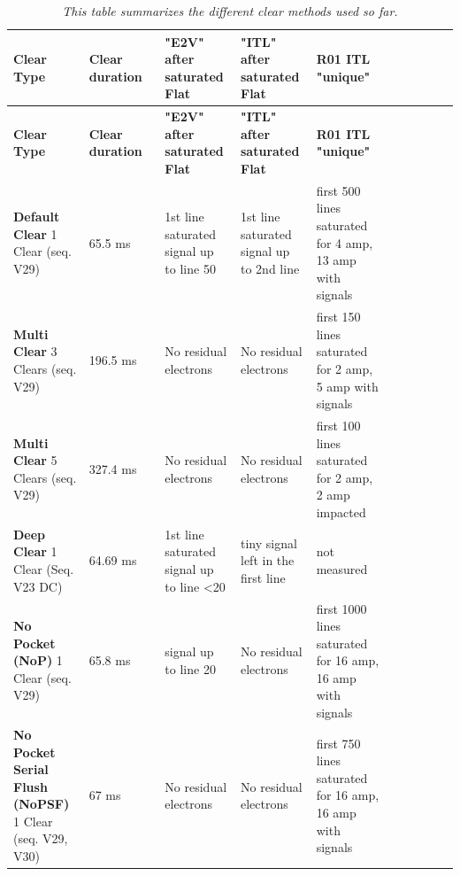 {\small
\begin{longtable}{|p{0.17\linewidth}|p{0.17\linewidth}|p{0.17\linewidth}|p{0.17\linewidth}|p{0.17\linewidth}|p{0.17\linewidth}|}
\caption{\emph{This table summarizes the different clear methods used so far.}} \\
\hline
\textbf{Clear Type} & \textbf{Clear duration} & \textbf{"E2V" after saturated Flat} & \textbf{"ITL" after saturated Flat} & \textbf{R01 ITL "unique"} \\
\hline
\endfirsthead

\hline
\textbf{Clear Type} & \textbf{Clear duration} & \textbf{"E2V" after saturated Flat} & \textbf{"ITL" after saturated Flat} & \textbf{R01 ITL "unique"} \\
\hline
\endhead

\hline
\endfoot

\hline
\endlastfoot

\textbf{Default Clear} 1 Clear (seq. V29) & 65.5 ms & 1st line saturated signal up to line 50 & 1st line saturated signal up to 2nd line & first 500 lines saturated for 4 amp, 13 amp with signals \\
\textbf{Multi Clear} 3 Clears (seq. V29) & 196.5 ms & No residual electrons & No residual electrons & first 150 lines saturated for 2 amp, 5 amp with signals \\
\textbf{Multi Clear} 5 Clears (seq. V29) & 327.4 ms & No residual electrons & No residual electrons & first 100 lines saturated for 2 amp, 2 amp impacted \\
\textbf{Deep Clear} 1 Clear (Seq. V23 DC) & 64.69 ms & 1st line saturated signal up to line <20 & tiny signal left in the first line & not measured \\
\textbf{No Pocket (NoP)} 1 Clear (seq. V29) & 65.8 ms & signal up to line 20 & No residual electrons & first 1000 lines saturated for 16 amp, 16 amp with signals \\
\textbf{No Pocket Serial Flush (NoPSF)} 1 Clear (seq. V29, V30) & 67 ms & No residual electrons & No residual electrons & first 750 lines saturated for 16 amp, 16 amp with signals \\
\end{longtable}
}


